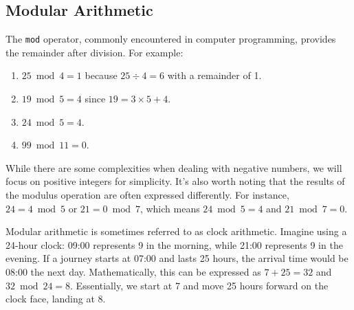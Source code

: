 \subsection*{Modular Arithmetic}
The \texttt{mod} operator, commonly encountered in computer programming, provides the remainder after division. For example:
\begin{enumerate}
    \item \(25 \bmod 4 = 1\) because \(25 \div 4 = 6\) with a remainder of 1.
    \item \(19 \bmod 5 = 4\) since \(19 = 3 \times 5 + 4\).
    \item \(24 \bmod 5 = 4\).
    \item \(99 \bmod 11 = 0\).
\end{enumerate}

While there are some complexities when dealing with negative numbers, we will focus on positive integers for simplicity. It’s also worth noting that the results of the modulus operation are often expressed differently. For instance, \(24 = 4 \bmod 5\) or \(21 = 0 \bmod 7\), which means \(24 \bmod 5 = 4\) and \(21 \bmod 7 = 0\).

Modular arithmetic is sometimes referred to as clock arithmetic. Imagine using a 24-hour clock: 09:00 represents 9 in the morning, while 21:00 represents 9 in the evening. If a journey starts at 07:00 and lasts 25 hours, the arrival time would be 08:00 the next day. Mathematically, this can be expressed as \(7 + 25 = 32\) and \(32 \bmod 24 = 8\). Essentially, we start at 7 and move 25 hours forward on the clock face, landing at 8.
